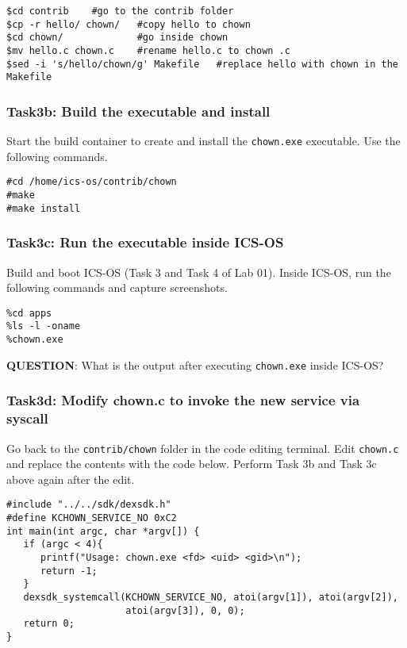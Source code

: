 \documentclass[a4paper, 11pt,oneside]{article}
\begin{document}
\begin{verbatim}
$cd contrib	   #go to the contrib folder
$cp -r hello/ chown/   #copy hello to chown
$cd chown/             #go inside chown
$mv hello.c chown.c    #rename hello.c to chown .c
$sed -i 's/hello/chown/g' Makefile   #replace hello with chown in the Makefile
\end{verbatim}

\subsubsection*{Task3b: Build the executable and install}
Start the build container to create and install the \texttt{chown.exe} 
executable. Use the following commands.
\begin{verbatim}
#cd /home/ics-os/contrib/chown
#make
#make install
\end{verbatim}

\subsubsection*{Task3c: Run the executable inside ICS-OS}
Build and boot ICS-OS (Task 3 and Task 4 of Lab 01). Inside ICS-OS, run the 
following commands and capture screenshots.

\begin{verbatim}
%cd apps
%ls -l -oname
%chown.exe
\end{verbatim}

\textbf{QUESTION}: What is the output after executing \texttt{chown.exe} inside 
ICS-OS? \newline

\subsubsection*{Task3d: Modify chown.c to invoke the new service via syscall}
Go back to the \texttt{contrib/chown} folder in the code editing terminal. Edit 
\texttt{chown.c} and replace the contents with the code below. Perform Task 3b 
and Task 3c above again after the edit.

\begin{verbatim}
#include "../../sdk/dexsdk.h"
#define KCHOWN_SERVICE_NO 0xC2
int main(int argc, char *argv[]) {
   if (argc < 4){ 
      printf("Usage: chown.exe <fd> <uid> <gid>\n");
      return -1; 
   }   
   dexsdk_systemcall(KCHOWN_SERVICE_NO, atoi(argv[1]), atoi(argv[2]), 
                     atoi(argv[3]), 0, 0); 
   return 0;
}
\end{verbatim}
\end{document}
